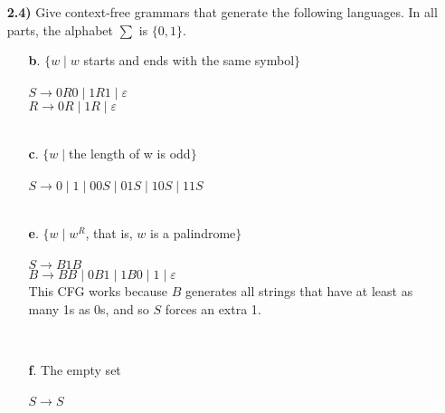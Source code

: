 \documentclass[12pt]{letter}
\begin{document}
\begin{enumerate}
\item[\textbf{2.4)}]Give context-free grammars that generate the following languages. In all parts, the alphabet  $\sum$ is $\{0,1\}$.
\begin{enumerate}
	\item[\textbf{b}.] $\{ w \mid w$ starts and ends with the same symbol$\}$ \\
	\leavevmode \\
	$S \rightarrow 0R0 \mid 1R1 \mid \varepsilon$ \\
	$R \rightarrow 0R \mid 1R \mid \varepsilon$ \\

	\leavevmode \\
	\item[\textbf{c}.] $\{ w \mid $the length of w is odd$\}$ \\
	\leavevmode \\
	$S \rightarrow 0 \mid 1 \mid 00S \mid 01S \mid 10S \mid 11S$ \\

	\leavevmode \\
	\item[\textbf{e}.] $\{ w \mid w^R$, that is, $w$ is a palindrome$\}$ \\
	\leavevmode \\
	$S \rightarrow B1B$ \\
	$B \rightarrow BB \mid 0B1 \mid 1B0 \mid 1 \mid \varepsilon$ \\
	This CFG works because $B$ generates all strings that have at least as many 1s as 0s, and so $S$ forces an extra 1.

	\leavevmode \\
	\item[\textbf{f}.] The empty set \\
	\leavevmode \\
	$S \rightarrow S$ \\

\end{enumerate}


\end{enumerate}
\end{document}
